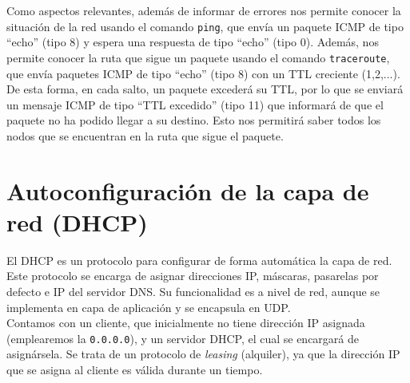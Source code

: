 Como aspectos relevantes, además de informar de errores nos permite conocer la situación de la red usando el comando \verb|ping|, que envía un paquete \acrshort{ICMP} de tipo ``echo'' (tipo 8) y espera una respuesta de tipo ``echo'' (tipo 0). Además, nos permite conocer la ruta que sigue un paquete usando el comando \verb|traceroute|, que envía paquetes \acrshort{ICMP} de tipo ``echo'' (tipo 8) con un \acrshort{TTL} creciente (1,2,...). De esta forma, en cada salto, un paquete excederá su \acrshort{TTL}, por lo que se enviará un mensaje \acrshort{ICMP} de tipo ``TTL excedido'' (tipo 11) que informará de que el paquete no ha podido llegar a su destino. Esto nos permitirá saber todos los nodos que se encuentran en la ruta que sigue el paquete.


\section{Autoconfiguración de la capa de red (\acrshort{DHCP})}

El \acrfull{DHCP} es un protocolo para configurar de forma automática la capa de red. Este protocolo se encarga de asignar direcciones IP, máscaras, pasarelas por defecto e IP del servidor \acrshort{DNS}. Su funcionalidad es a nivel de red, aunque se implementa en capa de aplicación y se encapsula en \acrshort{UDP}. \\

Contamos con un cliente, que inicialmente no tiene dirección IP asignada (emplearemos la \verb|0.0.0.0|), y un servidor \acrshort{DHCP}, el cual se encargará de asignársela. Se trata de un protocolo de \textit{leasing} (alquiler), ya que la dirección IP que se asigna al cliente es válida durante un tiempo.\\

